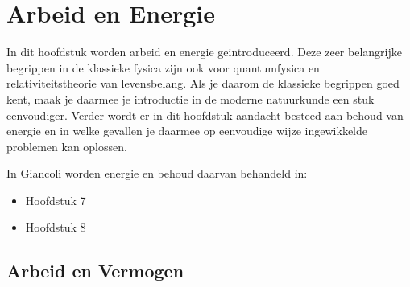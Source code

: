 
\chapter{Arbeid en Energie}\label{chap:energie}

In dit hoofdstuk worden arbeid en energie geintroduceerd. Deze zeer belangrijke begrippen
in de klassieke fysica zijn ook voor quantumfysica en relativiteitstheorie van levensbelang. Als
je daarom de klassieke begrippen goed kent, maak je daarmee je introductie in de moderne 
natuurkunde een stuk eenvoudiger.  Verder wordt er in dit hoofdstuk aandacht besteed aan
behoud van energie en in welke gevallen je daarmee op eenvoudige wijze ingewikkelde
problemen kan oplossen.

In Giancoli worden energie en behoud daarvan behandeld in:
\begin{itemize}
\item Hoofdstuk 7
\item Hoofdstuk 8
\end{itemize}

\section{Arbeid en Vermogen}

